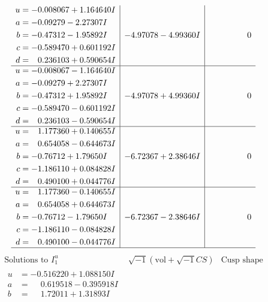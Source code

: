 \documentclass[1p]{elsarticle_modified}
\theoremstyle{definition}
\newcommand{\I}{\sqrt{-1}}
\begin{document}
$$\begin{array}{c|c|c}
\begin{aligned}
u &= -0.008067 + 1.164640 I \\
a &= -0.09279 - 2.27307 I \\
b &= -0.47312 - 1.95892 I \\
c &= -0.589470 + 0.601192 I \\
d &= \phantom{-}0.236103 + 0.590654 I\end{aligned}
 & -4.97078 - 4.99360 I & \phantom{-0.000000 } 0 \\ \hline\begin{aligned}
u &= -0.008067 - 1.164640 I \\
a &= -0.09279 + 2.27307 I \\
b &= -0.47312 + 1.95892 I \\
c &= -0.589470 - 0.601192 I \\
d &= \phantom{-}0.236103 - 0.590654 I\end{aligned}
 & -4.97078 + 4.99360 I & \phantom{-0.000000 } 0 \\ \hline\begin{aligned}
u &= \phantom{-}1.177360 + 0.140655 I \\
a &= \phantom{-}0.654058 - 0.644673 I \\
b &= -0.76712 + 1.79650 I \\
c &= -1.186110 + 0.084828 I \\
d &= \phantom{-}0.490100 + 0.044776 I\end{aligned}
 & -6.72367 + 2.38646 I & \phantom{-0.000000 } 0 \\ \hline\begin{aligned}
u &= \phantom{-}1.177360 - 0.140655 I \\
a &= \phantom{-}0.654058 + 0.644673 I \\
b &= -0.76712 - 1.79650 I \\
c &= -1.186110 - 0.084828 I \\
d &= \phantom{-}0.490100 - 0.044776 I\end{aligned}
 & -6.72367 - 2.38646 I & \phantom{-0.000000 } 0\\
 \hline 
 \end{array}$$\newpage$$\begin{array}{c|c|c}  
\text{Solutions to }I^u_{1}& \I (\text{vol} + \sqrt{-1}CS) & \text{Cusp shape}\\
 \hline 
\begin{aligned}
u &= -0.516220 + 1.088150 I \\
a &= \phantom{-}0.619518 - 0.395918 I \\
b &= \phantom{-}1.72011 + 1.31893 I \\

\end{aligned}
\end{array}$$
\end{document}
